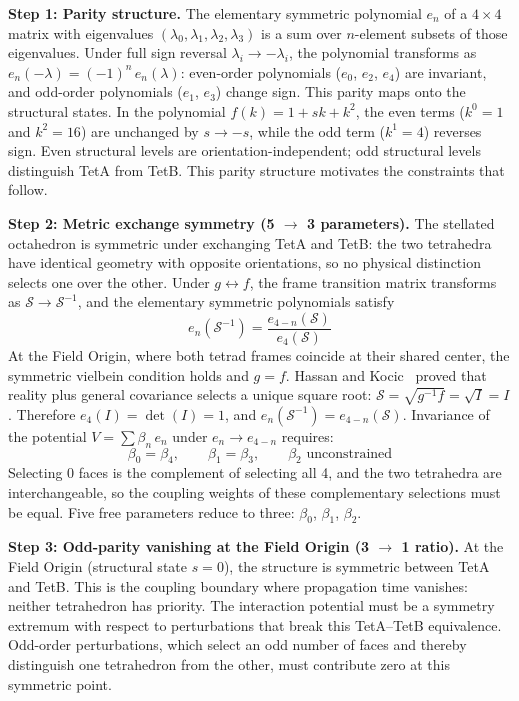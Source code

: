 \documentclass[aps,prd,preprint,superscriptaddress,showpacs,preprintnumbers,amsmath,amssymb,nofootinbib]{revtex4-2}
\begin{document}
\textbf{Step 1: Parity structure.} The elementary symmetric polynomial $e_n$ of a $4 \times 4$ matrix with eigenvalues $(\lambda_0, \lambda_1, \lambda_2, \lambda_3)$ is a sum over $n$-element subsets of those eigenvalues. Under full sign reversal $\lambda_i \to -\lambda_i$, the polynomial transforms as $e_n(-\lambda) = (-1)^n\,e_n(\lambda)$: even-order polynomials ($e_0$, $e_2$, $e_4$) are invariant, and odd-order polynomials ($e_1$, $e_3$) change sign. This parity maps onto the structural states. In the polynomial $f(k) = 1 + sk + k^2$, the even terms ($k^0 = 1$ and $k^2 = 16$) are unchanged by $s \to -s$, while the odd term ($k^1 = 4$) reverses sign. Even structural levels are orientation-independent; odd structural levels distinguish TetA from TetB. This parity structure motivates the constraints that follow.

\textbf{Step 2: Metric exchange symmetry (5 $\to$ 3 parameters).} The stellated octahedron is symmetric under exchanging TetA and TetB: the two tetrahedra have identical geometry with opposite orientations, so no physical distinction selects one over the other. Under $g \leftrightarrow f$, the frame transition matrix transforms as $\mathcal{S} \to \mathcal{S}^{-1}$, and the elementary symmetric polynomials satisfy
\begin{equation}
e_n(\mathcal{S}^{-1}) = \frac{e_{4-n}(\mathcal{S})}{e_4(\mathcal{S})}
\end{equation}
At the Field Origin, where both tetrad frames coincide at their shared center, the symmetric vielbein condition holds and $g = f$. Hassan and Kocic~\cite{hassankocic2018} proved that reality plus general covariance selects a unique square root: $\mathcal{S} = \sqrt{g^{-1}f} = \sqrt{I} = I$. Therefore $e_4(I) = \det(I) = 1$, and $e_n(\mathcal{S}^{-1}) = e_{4-n}(\mathcal{S})$. Invariance of the potential $V = \sum \beta_n\,e_n$ under $e_n \to e_{4-n}$ requires:
\begin{equation}
\beta_0 = \beta_4, \qquad \beta_1 = \beta_3, \qquad \beta_2 \text{ unconstrained}
\end{equation}
Selecting 0 faces is the complement of selecting all 4, and the two tetrahedra are interchangeable, so the coupling weights of these complementary selections must be equal. Five free parameters reduce to three: $\beta_0$, $\beta_1$, $\beta_2$.

\textbf{Step 3: Odd-parity vanishing at the Field Origin (3 $\to$ 1 ratio).} At the Field Origin (structural state $s = 0$), the structure is symmetric between TetA and TetB. This is the coupling boundary where propagation time vanishes: neither tetrahedron has priority. The interaction potential must be a symmetry extremum with respect to perturbations that break this TetA--TetB equivalence. Odd-order perturbations, which select an odd number of faces and thereby distinguish one tetrahedron from the other, must contribute zero at this symmetric point.
\end{document}
